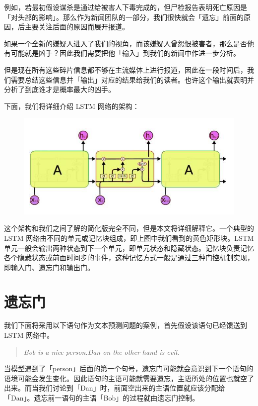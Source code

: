 \documentclass{article}
\begin{document}
例如，若最初假设谋杀是通过给被害人下毒完成的，但尸检报告表明死亡原因是「对头部的影响」。那么作为新闻团队的一部分，我们很快就会「遗忘」前面的原因，后主要关注后面的原因而展开报道。

如果一个全新的嫌疑人进入了我们的视角，而该嫌疑人曾怨恨被害者，那么是否他有可能就是凶手？因此我们需要把他「输入」到我们的新闻中作进一步分析。

但是现在所有这些碎片信息都不够在主流媒体上进行报道，因此在一段时间后，我们需要总结这些信息并「输出」对应的结果给我们的读者。也许这个输出就表明并分析了到底谁才是概率最大的凶手。

下面，我们将详细介绍 LSTM 网络的架构：
\begin{figure}[H]
	\centering
	\includegraphics[scale=0.3]{2.jpg}
\end{figure}
这个架构和我们之间了解的简化版完全不同，但是本文将详细解释它。一个典型的 LSTM 网络由不同的单元或记忆块组成，即上图中我们看到的黄色矩形块。LSTM 单元一般会输出两种状态到下一个单元，即单元状态和隐藏状态。记忆块负责记忆各个隐藏状态或前面时间步的事件，这种记忆方式一般是通过三种门控机制实现，即输入门、遗忘门和输出门。
\section{遗忘门}
我们下面将采用以下语句作为文本预测问题的案例，首先假设该语句已经馈送到 LSTM 网络中。
\begin{quote}
	\emph{Bob is a nice person.Dan on the other hand is evil.}
\end{quote}
当模型遇到了「person」后面的第一个句号，遗忘门可能就会意识到下一个语句的语境可能会发生变化。因此语句的主语可能就需要遗忘，主语所处的位置也就空了出来。而当我们讨论到「Dan」时，前面空出来的主语位置就应该分配给「Dan」。遗忘前一语句的主语「Bob」的过程就由遗忘门控制。
\end{document}
